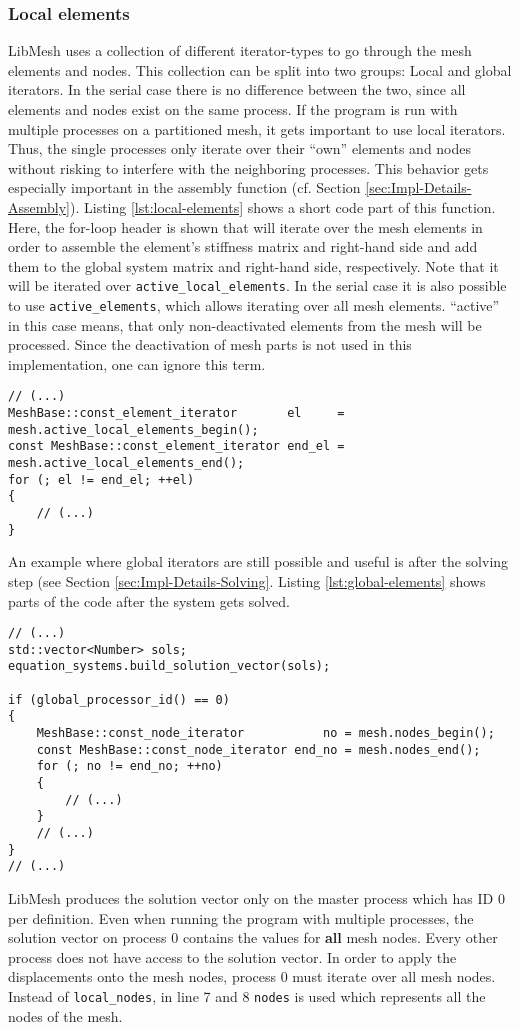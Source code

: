   
  \subsubsection{Local elements}\label{sec:Impl-Parallel-Local}
   LibMesh uses a collection of different iterator-types to go through the mesh elements and nodes. This collection can be split into two groups: Local and global iterators. In the serial case there is no difference between the two, since all elements and nodes exist on the same process. If the program is run with multiple processes on a partitioned mesh, it gets important to use local iterators. Thus, the single processes only iterate over their ``own'' elements and nodes without risking to interfere with the neighboring processes. This behavior gets especially important in the assembly function (cf. Section \ref{sec:Impl-Details-Assembly}). Listing \ref{lst:local-elements} shows a short code part of this function. Here, the for-loop header is shown that will iterate over the mesh elements in order to assemble the element's stiffness matrix and right-hand side and add them to the global system matrix and right-hand side, respectively. Note that it will be iterated over \texttt{active\_local\_elements}. In the serial case it is also possible to use \texttt{active\_elements}, which allows iterating over all mesh elements. ``active'' in this case means, that only non-deactivated elements from the mesh will be processed. Since the deactivation of mesh parts is not used in this implementation, one can ignore this term.
\begin{lstlisting}[caption=Local elements iterator,label=lst:local-elements,keepspaces=true]
// (...)
MeshBase::const_element_iterator       el     = mesh.active_local_elements_begin();
const MeshBase::const_element_iterator end_el = mesh.active_local_elements_end();
for (; el != end_el; ++el)
{
	// (...)
}
\end{lstlisting}
   An example where global iterators are still possible and useful is after the solving step (see Section \ref{sec:Impl-Details-Solving}. Listing \ref{lst:global-elements} shows parts of the code after the system gets solved.
\begin{lstlisting}[caption=Global nodes iterator,label=lst:global-elements,keepspaces=true]
// (...)
std::vector<Number> sols;
equation_systems.build_solution_vector(sols);

if (global_processor_id() == 0)
{
	MeshBase::const_node_iterator           no = mesh.nodes_begin();
	const MeshBase::const_node_iterator end_no = mesh.nodes_end();
	for (; no != end_no; ++no)
	{
		// (...)
	}
	// (...)
}
// (...)
\end{lstlisting}
   LibMesh produces the solution vector only on the master process which has ID 0 per definition. Even when running the program with multiple processes, the solution vector on process 0 contains the values for \textbf{all} mesh nodes. Every other process does not have access to the solution vector. In order to apply the displacements onto the mesh nodes, process 0 must iterate over all mesh nodes. Instead of \texttt{local\_nodes}, in line 7 and 8 \texttt{nodes} is used which represents all the nodes of the mesh.
  
